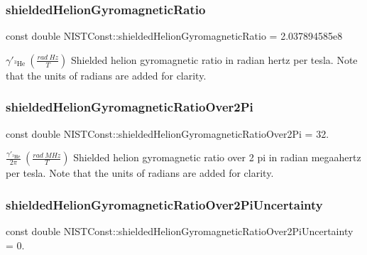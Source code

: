 \subsubsection{\texorpdfstring{shielded\+Helion\+Gyromagnetic\+Ratio}{shieldedHelionGyromagneticRatio}}
{\footnotesize\ttfamily const double N\+I\+S\+T\+Const\+::shielded\+Helion\+Gyromagnetic\+Ratio = 2.\+037894585e8}

$\gamma'_{^3\textrm{He}} \ (\frac{rad\ Hz}{T})$ Shielded helion gyromagnetic ratio in radian hertz per tesla. Note that the units of radians are added for clarity. \mbox{\label{group___n_i_s_t_const-_helion_gaed43f2ab9c5e89c6dda577a3b5fc265c}} 
\subsubsection{\texorpdfstring{shielded\+Helion\+Gyromagnetic\+Ratio\+Over2\+Pi}{shieldedHelionGyromagneticRatioOver2Pi}}
{\footnotesize\ttfamily const double N\+I\+S\+T\+Const\+::shielded\+Helion\+Gyromagnetic\+Ratio\+Over2\+Pi = 32.}

$\frac{\gamma'_{^3\textrm{He}}}{2 \pi} \ (\frac{rad\ MHz}{T})$ Shielded helion gyromagnetic ratio over 2 pi in radian megaahertz per tesla. Note that the units of radians are added for clarity. \mbox{\label{group___n_i_s_t_const-_helion_ga500ba901d47044d1bab3fb7ee6aeade1}} 
\subsubsection{\texorpdfstring{shielded\+Helion\+Gyromagnetic\+Ratio\+Over2\+Pi\+Uncertainty}{shieldedHelionGyromagneticRatioOver2PiUncertainty}}
{\footnotesize\ttfamily const double N\+I\+S\+T\+Const\+::shielded\+Helion\+Gyromagnetic\+Ratio\+Over2\+Pi\+Uncertainty = 0.}

